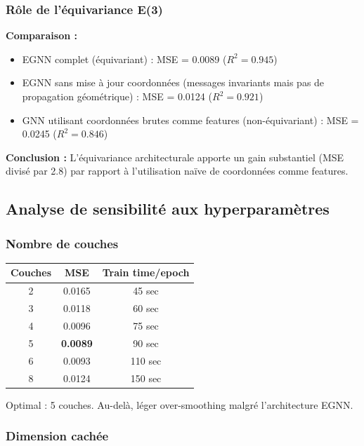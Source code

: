 \subsubsection{Rôle de l'équivariance E(3)}

\textbf{Comparaison :}
\begin{itemize}
    \item EGNN complet (équivariant) : MSE = 0.0089 ($R^2 = 0.945$)
    \item EGNN sans mise à jour coordonnées (messages invariants mais pas de propagation géométrique) : MSE = 0.0124 ($R^2 = 0.921$)
    \item GNN utilisant coordonnées brutes comme features (non-équivariant) : MSE = 0.0245 ($R^2 = 0.846$)
\end{itemize}

\textbf{Conclusion :}
L'équivariance architecturale apporte un gain substantiel (MSE divisé par 2.8) par rapport à l'utilisation naïve de coordonnées comme features.

\subsection{Analyse de sensibilité aux hyperparamètres}

\subsubsection{Nombre de couches}

\begin{center}
\begin{tabular}{|c|c|c|}
\hline
\textbf{Couches} & \textbf{MSE} & \textbf{Train time/epoch} \\
\hline
2 & 0.0165 & 45 sec \\
3 & 0.0118 & 60 sec \\
4 & 0.0096 & 75 sec \\
5 & \textbf{0.0089} & 90 sec \\
6 & 0.0093 & 110 sec \\
8 & 0.0124 & 150 sec \\
\hline
\end{tabular}
\end{center}

Optimal : 5 couches. Au-delà, léger over-smoothing malgré l'architecture EGNN.

\subsubsection{Dimension cachée}

